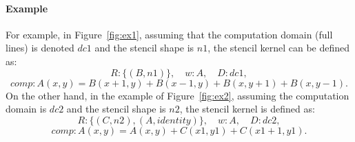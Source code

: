 \paragraph{\textbf{Example}}
For example, in Figure~\ref{fig:ex1}, assuming that the computation domain (full lines) is denoted $dc1$ and the stencil shape is $n1$, the stencil kernel can be defined as:
\begin{equation*}
R: \{(B,n1)\}, \quad w: A, \quad D: dc1,
\end{equation*}
\begin{equation*}
comp: A(x,y)=B(x+1,y)+B(x-1,y)+B(x,y+1)+B(x,y-1).
\end{equation*}
On the other hand, in the example of Figure~\ref{fig:ex2}, assuming the computation domain is $dc2$ and the stencil shape is $n2$, the stencil kernel is defined as:
\begin{equation*}
R: \{(C,n2),(A,identity)\}, \quad w: A, \quad D: dc2,
\end{equation*}
\begin{equation*}
comp: A(x,y)=A(x,y)+C(x1,y1)+C(x1+1,y1).
\end{equation*}

